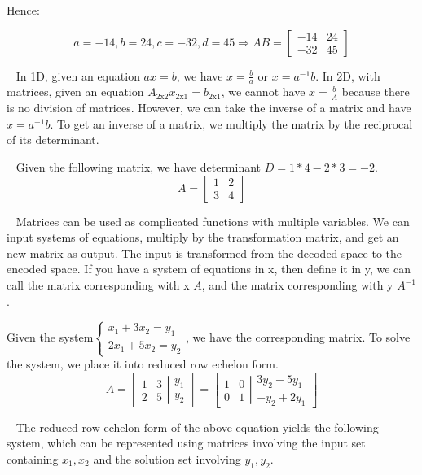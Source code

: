 \documentclass[11pt]{article}
\begin{document}
Hence:

$$a=-14,b=24,c=-32,d=45\Rightarrow AB=\begin{bmatrix}
-14 & 24\\-32 & 45
\end{bmatrix}$$

$\,\,\,$ In 1D, given an equation $ax=b$, we have $x=\frac{b}{a}$ or $x=a^{-1}b$. In 2D, with matrices, given an equation $A_{2\text{x}2}x_{2\text{x}1}=b_{2\text{x}1}$, we cannot have $x=\frac{b}{A}$ because there is no division of matrices. However, we can take the inverse of a matrix and have $x=a^{-1}b$. To get an inverse of a matrix, we multiply the matrix by the reciprocal of its determinant.

$\,\,\,$ Given the following matrix, we have determinant $D=1*4-2*3=-2$.
$$A=\begin{bmatrix}
1 & 2\\3 & 4
\end{bmatrix}$$

$\,\,\,$ Matrices can be used as complicated functions with multiple variables. We can input systems of equations, multiply by the transformation matrix, and get an new matrix as output. The input is transformed from the decoded space to the encoded space. If you have a system of equations in x, then define it in y, we can call the matrix corresponding with x $A$, and the matrix corresponding with y $A^{-1}$.

Given the system$\left\lbrace\begin{matrix}
x_1+3x_2=y_1\\2x_1+5x_2=y_2
\end{matrix}\right.$, we have the corresponding matrix. To solve the system, we place it into reduced row echelon form.
$$A=\left[\left.\begin{matrix}
1 & 3\\2 & 5
\end{matrix}\right|\begin{matrix}
y_1\\y_2
\end{matrix}\right]=
\left[\left.\begin{matrix}
1 & 0\\0 & 1
\end{matrix}\right|\begin{matrix}
3y_2-5y_1\\-y_2+2y_1
\end{matrix}\right]$$

$\,\,\,$ The reduced row echelon form of the above equation yields the following system, which can be represented using matrices involving the input set containing $x_1,x_2$ and the solution set involving $y_1,y_2$.
\end{document}
